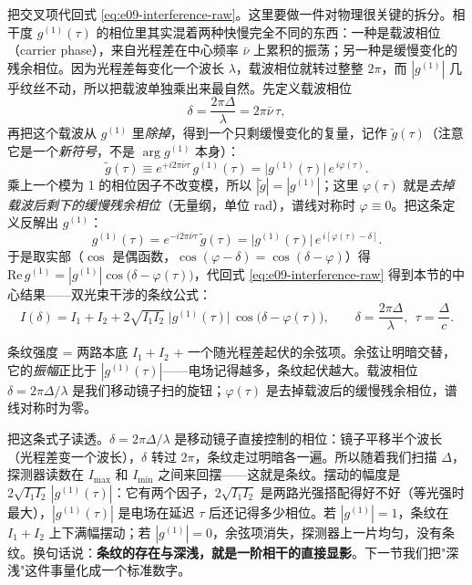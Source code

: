 把交叉项代回式 \eqref{eq:e09-interference-raw}。这里要做一件对物理很关键的拆分。相干度 \(g^{(1)}(\tau)\) 的相位里其实混着两种快慢完全不同的东西：一种是载波相位（carrier phase），来自光程差在中心频率 \(\bar\nu\) 上累积的振荡；另一种是缓慢变化的残余相位。因为光程差每变化一个波长 \(\lambda\)，载波相位就转过整整 \(2\pi\)，而 \(|g^{(1)}|\) 几乎纹丝不动，所以把载波单独乘出来最自然。先定义载波相位
\[
  \delta=\frac{2\pi\Delta}{\lambda}=2\pi\bar\nu\,\tau ,
\]
再把这个载波从 \(g^{(1)}\) 里\emph{除掉}，得到一个只剩缓慢变化的复量，记作 \(\tilde g(\tau)\)（注意它是一个\emph{新符号}，不是 \(\arg g^{(1)}\) 本身）：
\[
  \tilde g(\tau)\equiv e^{+i2\pi\bar\nu\tau}\,g^{(1)}(\tau)
  =\big|g^{(1)}(\tau)\big|\,e^{\,i\varphi(\tau)} .
\]
乘上一个模为 1 的相位因子不改变模，所以 \(|\tilde g|=|g^{(1)}|\)；这里 \(\varphi(\tau)\) 就是\emph{去掉载波后剩下的缓慢残余相位}（无量纲，单位 rad），谱线对称时 \(\varphi\equiv0\)。把这条定义反解出 \(g^{(1)}\)：
\[
  g^{(1)}(\tau)=e^{-i2\pi\bar\nu\tau}\,\tilde g(\tau)
  =\big|g^{(1)}(\tau)\big|\,e^{\,i[\varphi(\tau)-\delta]} .
\]
于是取实部（\(\cos\) 是偶函数，\(\cos(\varphi-\delta)=\cos(\delta-\varphi)\)）得 \(\mathrm{Re}\,g^{(1)}=|g^{(1)}|\cos\!\big(\delta-\varphi(\tau)\big)\)，代回式 \eqref{eq:e09-interference-raw} 得到本节的中心结果——双光束干涉的条纹公式：
\begin{equation}
  I(\delta)=I_1+I_2+2\sqrt{I_1 I_2}\;\big|g^{(1)}(\tau)\big|\,
  \cos\!\big(\delta-\varphi(\tau)\big),
  \qquad \delta=\frac{2\pi\Delta}{\lambda},\ \ \tau=\frac{\Delta}{c}.
  \label{eq:e09-fringe}
\end{equation}
\begin{formulaexplain}
条纹强度 = 两路本底 \(I_1+I_2\) + 一个随光程差起伏的余弦项。余弦让明暗交替，它的\emph{振幅}正比于 \(|g^{(1)}(\tau)|\)——电场记得越多，条纹起伏越大。载波相位 \(\delta=2\pi\Delta/\lambda\) 是我们移动镜子扫的旋钮；\(\varphi(\tau)\) 是去掉载波后的缓慢残余相位，谱线对称时为零。
\end{formulaexplain}

把这条式子读透。\(\delta=2\pi\Delta/\lambda\) 是移动镜子直接控制的相位：镜子平移半个波长（光程差变一个波长），\(\delta\) 转过 \(2\pi\)，条纹走过明暗各一遍。所以随着我们扫描 \(\Delta\)，探测器读数在 \(I_{\max}\) 和 \(I_{\min}\) 之间来回摆——这就是条纹。摆动的幅度是 \(2\sqrt{I_1 I_2}\,|g^{(1)}(\tau)|\)：它有两个因子，\(2\sqrt{I_1I_2}\) 是两路光强搭配得好不好（等光强时最大），\(|g^{(1)}(\tau)|\) 是电场在延迟 \(\tau\) 后还记得多少相位。若 \(|g^{(1)}|=1\)，条纹在 \(I_1+I_2\) 上下满幅摆动；若 \(|g^{(1)}|=0\)，余弦项消失，探测器上一片均匀，没有条纹。换句话说：\textbf{条纹的存在与深浅，就是一阶相干的直接显影}。下一节我们把"深浅"这件事量化成一个标准数字。


